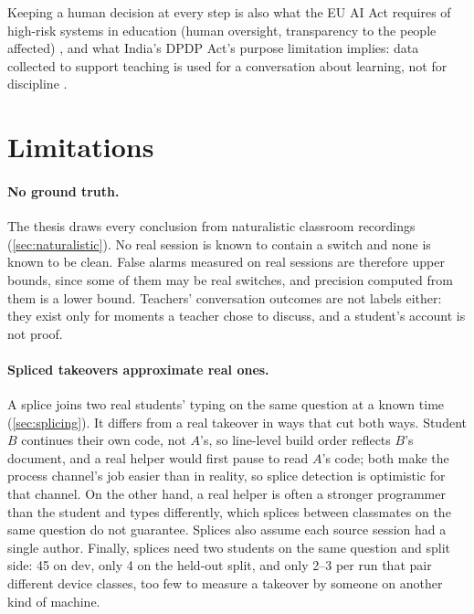 Keeping a human decision at every step is also what the EU AI Act requires of
high-risk systems in education (human oversight, transparency to the people
affected) \cite{euaiact2024}, and what India's DPDP Act's purpose limitation
implies: data collected to support teaching is used for a conversation about
learning, not for discipline \cite{dpdp2023}.

\section{Limitations}
\label{sec:disc-limitations}

\paragraph{No ground truth.} The thesis draws every conclusion from naturalistic
classroom recordings (\cref{sec:naturalistic}). No real session is known to
contain a switch and none is known to be clean. False alarms measured on real
sessions are therefore upper bounds, since some of them may be real switches, and
precision computed from them is a lower bound. Teachers' conversation outcomes
are not labels either: they exist only for moments a teacher chose to discuss,
and a student's account is not proof.

\paragraph{Spliced takeovers approximate real ones.} A splice joins two real
students' typing on the same question at a known time (\cref{sec:splicing}). It
differs from a real takeover in ways that cut both ways. Student $B$ continues
their own code, not $A$'s, so line-level build order reflects $B$'s document,
and a real helper would first pause to read $A$'s code; both make the process
channel's job easier than in reality, so splice detection is optimistic for that
channel. On the other hand, a real helper is often a stronger programmer than
the student and types differently, which splices between classmates on the same
question do not guarantee. Splices also assume each source session had a single
author. Finally, splices need two students on the same question and split side:
45 on dev, only 4 on the held-out split, and only 2--3 per run that pair
different device classes, too few to measure a takeover by someone on another
kind of machine.

